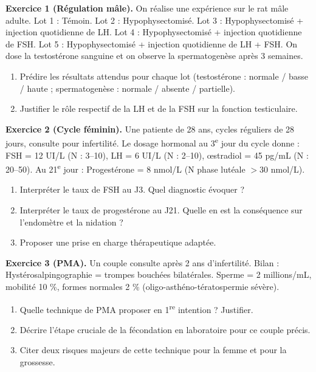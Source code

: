 \documentclass[11pt]{article}
\begin{document}
\begin{exercice}
\textbf{Exercice 1 (Régulation mâle).} On réalise une expérience sur le rat mâle adulte. Lot 1 : Témoin. Lot 2 : Hypophysectomisé. Lot 3 : Hypophysectomisé + injection quotidienne de LH. Lot 4 : Hypophysectomisé + injection quotidienne de FSH. Lot 5 : Hypophysectomisé + injection quotidienne de LH + FSH. On dose la testostérone sanguine et on observe la spermatogenèse après 3 semaines.
\begin{enumerate}
\item Prédire les résultats attendus pour chaque lot (testostérone : normale / basse / haute ; spermatogenèse : normale / absente / partielle).
\item Justifier le rôle respectif de la LH et de la FSH sur la fonction testiculaire.
\end{enumerate}

\textbf{Exercice 2 (Cycle féminin).} Une patiente de 28 ans, cycles réguliers de 28 jours, consulte pour infertilité. Le dosage hormonal au 3\textsuperscript{e} jour du cycle donne : FSH = 12 UI/L (N : 3--10), LH = 6 UI/L (N : 2--10), \oe{}stradiol = 45 pg/mL (N : 20--50). Au 21\textsuperscript{e} jour : Progestérone = 8 nmol/L (N phase lutéale $> 30$ nmol/L).
\begin{enumerate}
\item Interpréter le taux de FSH au J3. Quel diagnostic évoquer ?
\item Interpréter le taux de progestérone au J21. Quelle en est la conséquence sur l'endomètre et la nidation ?
\item Proposer une prise en charge thérapeutique adaptée.
\end{enumerate}

\textbf{Exercice 3 (PMA).} Un couple consulte après 2 ans d'infertilité. Bilan : Hystérosalpingographie = trompes bouchées bilatérales. Sperme = 2 millions/mL, mobilité 10 \%, formes normales 2 \% (oligo-asthéno-tératospermie sévère).
\begin{enumerate}
\item Quelle technique de PMA proposer en 1\textsuperscript{re} intention ? Justifier.
\item Décrire l'étape cruciale de la fécondation en laboratoire pour ce couple précis.
\item Citer deux risques majeurs de cette technique pour la femme et pour la grossesse.
\end{enumerate}
\end{exercice}
\end{document}
